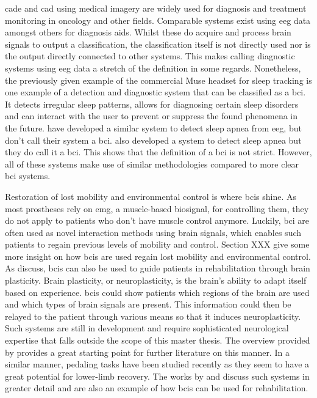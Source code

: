 \Gls{cade} and \gls{cad} using medical imagery are widely used for diagnosis and treatment monitoring in oncology and other fields.
Comparable systems exist using \gls{eeg} data amongst others for diagnosis aids.
Whilst these do acquire and process brain signals to output a classification, the classification itself is not directly used nor is the output directly connected to other systems.
This makes calling diagnostic systems using \gls{eeg} data a stretch of the definition in some regards.
Nonetheless, the previously given example of the commercial Muse headset for sleep tracking is one example of a detection and diagnostic system that can be classified as a \gls{bci}.
It detects irregular sleep patterns, allows for diagnosing certain sleep disorders and can interact with the user to prevent or suppress the found phenomena in the future.
 have developed a similar system to detect sleep apnea from \gls{eeg}, but don't call their system a \gls{bci}.
 also developed a system to detect sleep apnea but they do call it a \gls{bci}.
This shows that the definition of a \gls{bci} is not strict.
However, all of these systems make use of similar methodologies compared to more clear \gls{bci} systems.



Restoration of lost mobility and environmental control is where \glspl{bci} shine.
As most prostheses rely on \gls{emg}, a muscle-based \gls{biosignal}, for controlling them, they do not apply to patients who don't have muscle control anymore.
Luckily, \gls{bci} are often used as novel interaction methods using brain signals, which enables such patients to regain previous levels of mobility and control.
Section XXX give some more insight on how \glspl{bci} are used regain lost mobility and environmental control. %
As \citet{bci_rehabilitation} discuss, \glspl{bci} can also be used to guide patients in rehabilitation through brain plasticity.
Brain plasticity, or neuroplasticity, is the brain's ability to adapt itself based on experience.
\Glspl{bci} could show patients which regions of the brain are used and which types of brain signals are present.
This information could then be relayed to the patient through various means so that it induces neuroplasticity.
Such systems are still in development and require sophisticated neurological expertise that falls outside the scope of this master thesis.
The overview provided by \citet{bci_rehabilitation} provides a great starting point for further literature on this manner.
In a similar manner, pedaling  tasks have been studied recently as they seem to have a great potential for lower-limb recovery.
The works by \citet{pedal_mi_rehabilitation1} and \citet{pedal_mi_rehabilitation2} discuss such systems in greater detail and are also an example of how \glspl{bci} can be used for rehabilitation.

